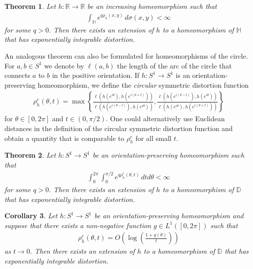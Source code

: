 \documentclass{amsart}
\theoremstyle{plain}
\newtheorem{theorem}{Theorem}
\newtheorem{corollary}[theorem]{Corollary}
\theoremstyle{definition}
\theoremstyle{remark}
\numberwithin{equation}{section}
\numberwithin{theorem}{section}
\numberwithin{conjecture}{section}
\newcommand{\R}{\mathbb R}
\newcommand{\D}{\mathbb D}
\newcommand{\1}{\mathbf 1}
\newcommand{\UHP}{\mathbb H}
\begin{document}
\begin{theorem}\label{theorem:david_line}
Let $h\colon \R\to\R$ be an increasing homeomorphism such that 
\begin{align*}
\int_{\UHP} e^{q \rho_h(x,y)} \, d\sigma(x,y) <\infty
\end{align*}
for some $q>0$. Then there exists an extension of $h$ to a homeomorphism of $\UHP$ that has exponentially integrable distortion. 
\end{theorem}

An analogous theorem can also be formulated for homeomorphisms of the circle. For $a,b\in S^1$ we denote by $\ell(a,b)$ the length of the arc of the circle that connects $a$ to $b$ in the positive orientation. If $h\colon S^1\to S^1$ is an orientation-preserving homeomorphism, we define the \textit{circular} symmetric distortion function
\begin{align*}
\rho_h^c(\theta,t)= \max \left\{ \frac{\ell(h(e^{i\theta}),h(e^{i(\theta+t)}))}{\ell(h(e^{i(\theta-t)}),h(e^{i\theta}))}, \frac{\ell(h(e^{i(\theta-t)}),h(e^{i\theta}))}{\ell(h(e^{i\theta}),h(e^{i(\theta+t)}))} \right\}
\end{align*}
for $\theta\in [0,2\pi]$ and $t\in (0,\pi/2)$. One could alternatively use Euclidean distances in the definition of the circular symmetric distortion function and obtain a quantity that is comparable to $\rho_h^c$ for all small $t$.

\begin{theorem}\label{theorem:david_circle}
Let $h\colon S^1\to S^1$ be an orientation-preserving homeomorphism such that
\begin{align*}
\int_0^{2\pi} \int_0^{\pi/2} e^{q \rho_h^c(\theta,t)} \, dtd\theta <\infty
\end{align*}
for some $q>0$. Then there exists an extension of $h$ to a homeomorphism of $\D$ that has exponentially integrable distortion.
\end{theorem}

\begin{corollary}\label{corollary:david_circle}
Let $h\colon S^1\to S^1$ be an orientation-preserving homeomorphism and suppose that there exists a non-negative function $g\in L^1([0,2\pi])$ such that
\begin{align*}
\rho_h^c(\theta,t) = O\left( \log \left(\frac{1+g(\theta)}{t} \right)\right)
\end{align*}
as $t\to 0$. Then there exists an extension of $h$ to a homeomorphism of $\D$ that has exponentially integrable distortion.
\end{corollary}
\end{document}
